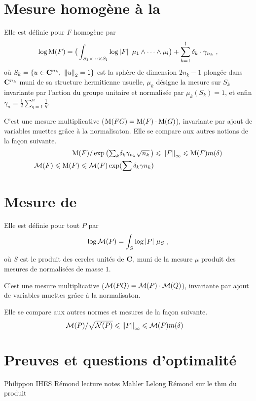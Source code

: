 \section{Mesure homogène à la \texorpdfstring{}{Philippon}}

Elle est définie pour $F$ homogène par
\[
  \log \mathrm{M}(F)
  = \big(
  \int_{S_{1}\times\cdots\times S_{l}}
  \log\left\lvert F\right\rvert\ \mu_1 \wedge \cdots \wedge \mu_l
  \big) + \sum_{k=1}^l \delta_k \cdot \gamma_{n_k}
  \text{ ,}
\]
où $S_k = \{ u \in \C^{n_k},\ \normeuc u = 1 \}$ est la sphère de dimension
$2n_k-1$ plongée dans $\mathbf{C}^{n_k}$ muni de sa structure hermitienne usuelle,
$\mu_k$ désigne la mesure sur $S_k$ invariante par l'action du groupe unitaire
et normalisée par $\mu_k(S_k) = 1$, et enfin $\gamma_n = \frac12
\sum_{q=1}^{n} \frac1q$.

C'est une mesure multiplicative ($\mathrm{M}(FG) = \mathrm{M}(F) \cdot \mathrm{M}(G)$),
invariante par ajout de variables muettes grâce à la normalisaton.  Elle se compare aux autres
notions de la façon suivante.
\begin{align}
  \mathrm{M}(F) / \exp\big(
    {\textstyle\sum_k} \delta_k \gamma_{n_k} \sqrt{n_k}
  \,\big)
  & \leqslant \left\lVert F\right\rVert_\infty
  \leqslant \mathrm{M}(F) m(\delta)
  \\
  \mathcal{M}(F)
  \leqslant \mathrm{M}(F)
  \leqslant \mathcal{M}(F) \exp(\sum\delta_k\gamma{n_k})
\end{align}

\section{Mesure de \texorpdfstring{}{Mahler}}

Elle est définie pour tout $P$ par
\[
  \log\mathcal{M}(P)
  = \int_S \log\left\lvert P\right\rvert\, \mu_S \text{ ,}
\]
où $S$ est le produit des cercles unités de $\mathbf{C}$, muni de la mesure $\mu$
produit des mesures de  normalisées de masse $1$.

C'est une mesure multiplicative ($\mathcal{M}(PQ) = \mathcal{M}(P) \cdot \mathcal{M}(Q)$),
invariante par ajout de variables muettes grâce à la normalisaton. 

Elle se compare aux autres normes et mesures de la façon suivante.
\begin{align}
  \mathcal{M}(P) / \sqrt{\mathcal N(P)}
  & \leqslant \left\lVert F\right\rVert_\infty
  \leqslant \mathcal{M}(P) m(\delta)
\end{align}

\section{Preuves et questions d'optimalité}

\begin{thebibliography}{9}
   Philippon IHES
   Rémond lecture notes
   Mahler
   Lelong
   Rémond sur le thm du produit
\end{thebibliography}


